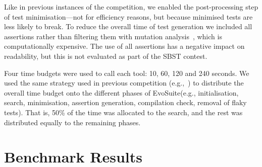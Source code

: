 \documentclass[sigconf,table]{acmart}
\newcommand{\EVOSUITE}{{\sc EvoSuite}\xspace}
\newcommand{\TT}{{\sc T3}\xspace}
\begin{document}
Like in previous instances of the competition, we enabled the
post-processing step of test minimisation---not for efficiency
reasons, but because minimised tests are less likely to break. To
reduce the overall time of test generation we included all assertions
rather than filtering them with mutation
analysis~\cite{10.1109/TSE.2011.93}, which is computationally
expensive. The use of all assertions has a negative impact on
readability, but this is not evaluated as part of the SBST contest.

Four time budgets were used to call each tool: 10, 60, 120 and 240
seconds. We used the same strategy used in previous competition
(e.g.,~\cite{evosuiteAtSbst2016}) to distribute the overall time
budget onto the different phases of \EVOSUITE (e.g., initialisation,
search, minimisation, assertion generation, compilation check, removal
of flaky tests). That is, 50\% of the time was allocated to the
search, and the rest was distributed equally to the remaining phases.


\section{Benchmark Results}

\begin{table*}[t]
  \centering
  \caption{\label{table:results}Detailed results of \EVOSUITE on the
    SBST benchmark classes.}
\vspace{-1em}
\resizebox{\textwidth}{!}{  

}	
\end{table*}

%

% 

% 
\end{document}
